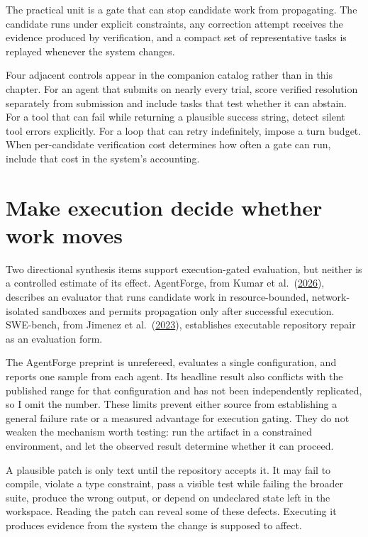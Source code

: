 The practical unit is a gate that can stop candidate work from propagating. The candidate runs under explicit constraints, any correction attempt receives the evidence produced by verification, and a compact set of representative tasks is replayed whenever the system changes.

Four adjacent controls appear in the companion catalog rather than in this chapter. For an agent that submits on nearly every trial, score verified resolution separately from submission and include tasks that test whether it can abstain. For a tool that can fail while returning a plausible success string, detect silent tool errors explicitly. For a loop that can retry indefinitely, impose a turn budget. When per-candidate verification cost determines how often a gate can run, include that cost in the system's accounting.

\hypertarget{make-execution-decide-whether-work-moves}{%
\section{Make execution decide whether work moves}\label{make-execution-decide-whether-work-moves}}

Two directional synthesis items support execution-gated evaluation, but neither is a controlled estimate of its effect. AgentForge, from Kumar et al.~(\href{https://arxiv.org/abs/2604.13120}{2026}), describes an evaluator that runs candidate work in resource-bounded, network-isolated sandboxes and permits propagation only after successful execution. SWE-bench, from Jimenez et al.~(\href{https://arxiv.org/abs/2310.06770}{2023}), establishes executable repository repair as an evaluation form.

The AgentForge preprint is unrefereed, evaluates a single configuration, and reports one sample from each agent. Its headline result also conflicts with the published range for that configuration and has not been independently replicated, so I omit the number. These limits prevent either source from establishing a general failure rate or a measured advantage for execution gating. They do not weaken the mechanism worth testing: run the artifact in a constrained environment, and let the observed result determine whether it can proceed.

A plausible patch is only text until the repository accepts it. It may fail to compile, violate a type constraint, pass a visible test while failing the broader suite, produce the wrong output, or depend on undeclared state left in the workspace. Reading the patch can reveal some of these defects. Executing it produces evidence from the system the change is supposed to affect.

